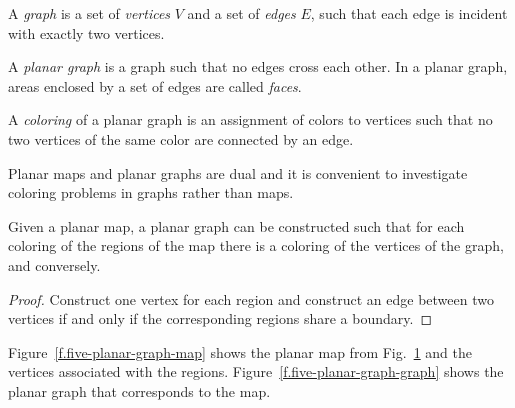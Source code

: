 \begin{figure}[t]
{
}
\label{f.five-planar-map-five}
\label{f.five-planar-map-four}
\end{figure}

\begin{definition}
A \emph{graph} is a set of \emph{vertices} $V$ and a set of \emph{edges} $E$, such that each edge is incident with exactly two vertices.

A \emph{planar graph} is a graph such that no edges cross each other. In a planar graph, areas enclosed by a set of edges are called \emph{faces}.

A \emph{coloring} of a planar graph is an assignment of colors to vertices such that no two vertices of the same color are connected by an edge.
\end{definition}

Planar maps and planar graphs are dual and it is convenient to investigate coloring problems in graphs rather than maps.

\begin{theorem}
Given a planar map, a planar graph can be constructed such that for each coloring of the regions of the map there is a coloring of the vertices of the graph, and conversely.
\end{theorem}

\begin{proof}
Construct one vertex for each region and construct an edge between two vertices if and only if the corresponding regions share a boundary. 
\end{proof}

\begin{example}
Figure~\ref{f.five-planar-graph-map} shows the planar map from Fig.~\ref{f.five-planar-map-four} and the vertices associated with the regions. Figure~\ref{f.five-planar-graph-graph} shows the planar graph that corresponds to the map.
\end{example}

